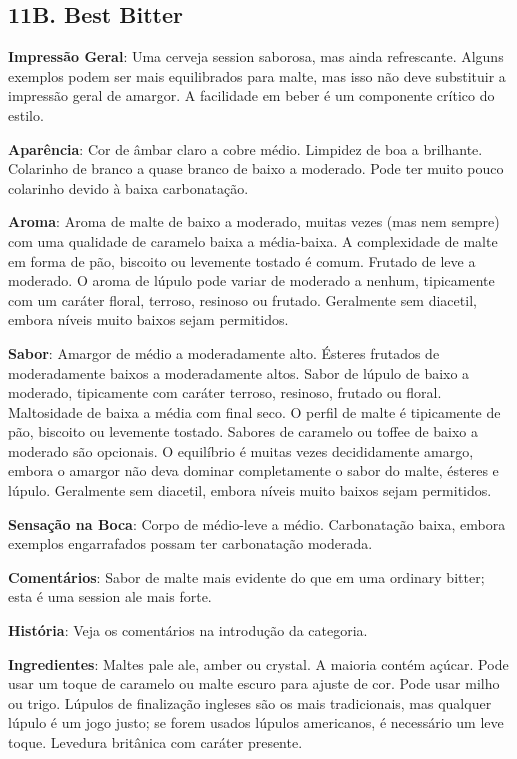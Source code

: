 \subsection*{11B. Best Bitter}

\textbf{Impressão Geral}: Uma cerveja session saborosa, mas ainda refrescante. Alguns exemplos podem ser mais equilibrados para malte, mas isso não deve substituir a impressão geral de amargor. A facilidade em beber é um componente crítico do estilo.

\textbf{Aparência}: Cor de âmbar claro a cobre médio. Limpidez de boa a brilhante. Colarinho de branco a quase branco de baixo a moderado. Pode ter muito pouco colarinho devido à baixa carbonatação.

\textbf{Aroma}: Aroma de malte de baixo a moderado, muitas vezes (mas nem sempre) com uma qualidade de caramelo baixa a média-baixa. A complexidade de malte em forma de pão, biscoito ou levemente tostado é comum. Frutado de leve a moderado. O aroma de lúpulo pode variar de moderado a nenhum, tipicamente com um caráter floral, terroso, resinoso ou frutado. Geralmente sem diacetil, embora níveis muito baixos sejam permitidos.

\textbf{Sabor}: Amargor de médio a moderadamente alto. Ésteres frutados de moderadamente baixos a moderadamente altos. Sabor de lúpulo de baixo a moderado, tipicamente com caráter terroso, resinoso, frutado ou floral. Maltosidade de baixa a média com final seco. O perfil de malte é tipicamente de pão, biscoito ou levemente tostado. Sabores de caramelo ou toffee de baixo a moderado são opcionais. O equilíbrio é muitas vezes decididamente amargo, embora o amargor não deva dominar completamente o sabor do malte, ésteres e lúpulo. Geralmente sem diacetil, embora níveis muito baixos sejam permitidos.

\textbf{Sensação na Boca}: Corpo de médio-leve a médio. Carbonatação baixa, embora exemplos engarrafados possam ter carbonatação moderada.

\textbf{Comentários}: Sabor de malte mais evidente do que em uma ordinary bitter; esta é uma session ale mais forte.

\textbf{História}: Veja os comentários na introdução da categoria.

\textbf{Ingredientes}: Maltes pale ale, amber ou crystal. A maioria contém açúcar. Pode usar um toque de caramelo ou malte escuro para ajuste de cor. Pode usar milho ou trigo. Lúpulos de finalização ingleses são os mais tradicionais, mas qualquer lúpulo é um jogo justo; se forem usados lúpulos americanos, é necessário um leve toque. Levedura britânica com caráter presente.

